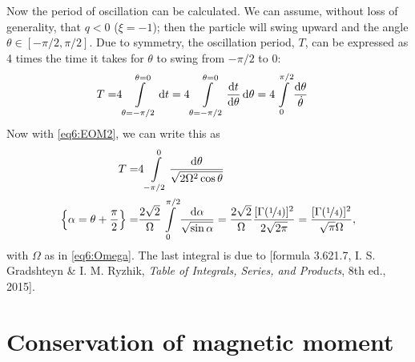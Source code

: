 \documentclass[11pt,a4paper, 
swedish, english %
]{article}
\begin{document}
Now the period of oscillation can be calculated. We can assume,
without loss of generality, that $q<0$ ($\xi=-1$); then the particle
will swing upward and the angle $\theta\in[-\pi/2, \pi/2]$. Due to
symmetry, the oscillation period, $T$, can be expressed as 4 times the
time it takes for $\theta$ to swing from $-\pi/2$ to 0:
\begin{equation}
\begin{aligned}
T=&4\int_{\theta=-\pi/2}^{\theta=0}\rd t
=4\int_{\theta=-\pi/2}^{\theta=0}\dv{t}{\theta}\id\theta
=4\int_0^{\pi/2}\frac{\rd\theta}{\dot\theta}
\end{aligned}
\end{equation}
Now with \eqref{eq6:EOM2}, we can write this as
\begin{equation}
\begin{aligned}
T=&4\int_{-\pi/2}^0\frac{\rd\theta}{\sqrt{2\Omega^2\cos\theta}}\\
\qty{\alpha=\theta+\frac{\pi}{2}}
=&\frac{2\sqrt{2}}{\Omega}\int_0^{\pi/2}\frac{\rd\alpha}{\sqrt{\sin\alpha}}
=\frac{2\sqrt{2}}{\Omega}\frac{[\Gamma(\nicefrac14)]^2}{2\sqrt{2\pi}}
=\frac{[\Gamma(\nicefrac14)]^2}{\sqrt{\pi}\Omega},
\end{aligned}
\end{equation}
with $\Omega$ as in \eqref{eq6:Omega}.
The last integral is due to [formula 3.621.7, I. S. Gradshteyn \&
I. M. Ryzhik, \textit{Table of Integrals, Series, and Products}, 8th
ed., 2015].


\section{Conservation of magnetic moment}




\end{document}
